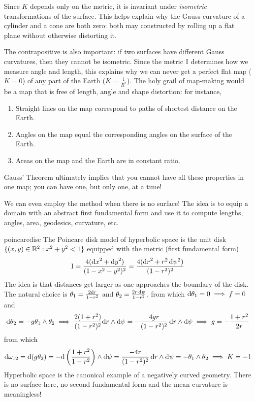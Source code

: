Since $K$ depends only on the metric, it is invariant under \emph{isometric} transformations of the surface. This helps explain why the Gauss curvature of a cylinder and a cone are both zero: both may constructed by rolling up a flat plane without otherwise distorting it.\smallbreak

The contrapositive is also important: if two surfaces have different Gauss curvatures, then they cannot be isometric. Since the metric $\mathrm{I}$ determines how we measure angle and length, this explains why we can never get a perfect flat map ($K=0$) of any part of the Earth ($K=\frac 1{R^2}$). The holy grail of map-making would be a map that is free of length, angle and shape distortion: for instance,
\begin{enumerate}
  \item Straight lines on the map correspond to paths of shortest distance on the Earth.
  \item Angles on the map equal the corresponding angles on the surface of the Earth.
  \item Areas on the map and the Earth are in constant ratio.
\end{enumerate}
Gauss' Theorem ultimately implies that you cannot have all these properties in one map; you can have one, but only one, at a time!


\goodbreak


We can even employ the method when there is no surface! The idea is to equip a domain with an abstract first fundamental form and use it to compute lengths, angles, area, geodesics, curvature, etc.

\begin{example}{}{poincaredisc}
The Poincare disk model of hyperbolic space is the unit disk $\{(x,y)\in\mathbb{R}^2:x^2+y^2<1\}$ equipped with the metric (first fundamental form)
\[\mathrm{I}=\frac{4({\mathrm{d} x}^2+{\mathrm{d} y}^2)}{(1-x^2-y^2)^2}=\frac{4({\mathrm{d} r}^2+r^2\,\mathrm{d}\psi^2)}{(1-r^2)^2}\]
The idea is that distances get larger as one approaches the boundary of the disk. The natural choice is $\theta_1=\frac{2{\mathrm{d} r}}{1-r^2}$ and $\theta_2=\frac{2r\,\mathrm{d}\psi}{1-r^2}$, from which $\mathrm{d}\theta_1=0\implies f=0$ and
  \begin{gather*}
		\mathrm{d}\theta_2=-g\theta_1\wedge\theta_2\implies \frac{2(1+r^2)}{(1-r^2)^2}{\mathrm{d} r}\wedge\mathrm{d}\psi=-\frac{4gr}{(1-r^2)^2}\,{\mathrm{d} r}\wedge\mathrm{d}\psi\implies g=-\frac{1+r^2}{2r}
  \end{gather*}
	from which
  \[\mathrm{d}\omega_{12}=\mathrm{d}(g\theta_2)=-\mathrm{d}\left(\frac{1+r^2}{1-r^2}\right)\wedge\mathrm{d}\psi =\frac{-4r}{(1-r^2)^2}\,{\mathrm{d} r}\wedge\mathrm{d}\psi =-\theta_1\wedge\theta_2\implies K=-1\]
  Hyperbolic space is the canonical example of a negatively curved geometry. There is no surface here, no second fundamental form and the mean curvature is meaningless! 
\end{example}

